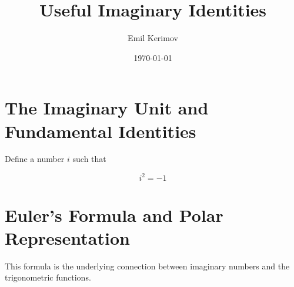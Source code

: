 \documentclass[a4paper]{article}
\title{Useful Imaginary Identities}
\author{Emil Kerimov}
\date{\today}
\begin{document}
\maketitle





\section{The Imaginary Unit and Fundamental Identities}\label{uii:sec:definition}
Define a number $i$ such that 
\begin{definition} \label{uii:i def}
$$
\boxed{
i^2 = -1
}$$
\end{definition}

\section{Euler's Formula and Polar Representation}\label{uii:sec:eulers-formula}
This formula is the underlying connection between imaginary numbers and the trigonometric functions.
\end{document}
